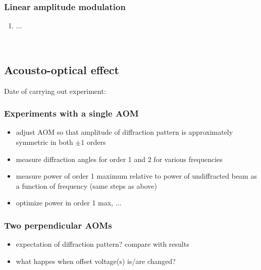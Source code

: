 \subsubsection{Linear amplitude modulation}
\begin{enumerate}
    \item ...
\end{enumerate}


\newpage\ \newpage
\subsection{Acousto-optical effect}
Date of carrying out experiment: 

\subsubsection{Experiments with a single AOM}
\begin{itemize}
    \item adjust AOM so that amplitude of diffraction pattern is
    approximately symmetric in both $\pm 1$ orders
    \item measure diffraction angles for order 1 and 2 for
    various frequencies
    \item measure power of order 1 maximum relative to power of undiffracted
    beam as a function of frequency (same steps as above)
    \item optimize power in order 1 max, ...
\end{itemize}

\subsubsection{Two perpendicular AOMs}
\begin{itemize}
    \item expectation of diffraction pattern? compare with results
    \item what happes when offset voltage(s) is/are changed?
\end{itemize}
